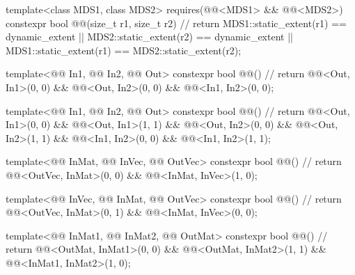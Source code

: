 \begin{codeblock}
template<class MDS1, class MDS2>
  requires(@@<MDS1> && @@<MDS2>)
  constexpr
  bool @@(size_t r1, size_t r2) {         // \expos
    return MDS1::static_extent(r1) == dynamic_extent ||
           MDS2::static_extent(r2) == dynamic_extent ||
           MDS1::static_extent(r1) == MDS2::static_extent(r2);
  }

template<@@ In1, @@ In2, @@ Out>
  constexpr bool @@() {                            // \expos
    return @@<Out, In1>(0, 0) &&
           @@<Out, In2>(0, 0) &&
           @@<In1, In2>(0, 0);
  }

template<@@ In1, @@ In2, @@ Out>
  constexpr bool @@() {                            // \expos
    return @@<Out, In1>(0, 0) &&
           @@<Out, In1>(1, 1) &&
           @@<Out, In2>(0, 0) &&
           @@<Out, In2>(1, 1) &&
           @@<In1, In2>(0, 0) &&
           @@<In1, In2>(1, 1);
  }

template<@@ InMat, @@ InVec, @@ OutVec>
  constexpr bool @@() {                       // \expos
    return @@<OutVec, InMat>(0, 0) &&
           @@<InMat, InVec>(1, 0);
  }

template<@@ InVec, @@ InMat, @@ OutVec>
  constexpr bool @@() {                       // \expos
    return @@<OutVec, InMat>(0, 1) &&
           @@<InMat, InVec>(0, 0);
  }

template<@@ InMat1, @@ InMat2, @@ OutMat>
  constexpr bool @@() {                       // \expos
    return @@<OutMat, InMat1>(0, 0) &&
           @@<OutMat, InMat2>(1, 1) &&
           @@<InMat1, InMat2>(1, 0);
  }
\end{codeblock}

